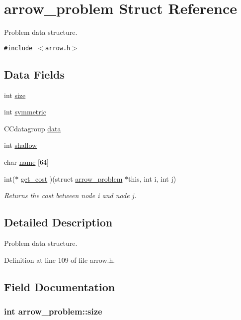 \hypertarget{structarrow__problem}{
\section{arrow\_\-problem Struct Reference}
\label{structarrow__problem}
}
Problem data structure.  


{\tt \#include $<$arrow.h$>$}

\subsection*{Data Fields}
\begin{CompactItemize}
\item 
int \hyperlink{structarrow__problem_de8573ddc391d06b08b65923fca693ec}{size}
\item 
int \hyperlink{structarrow__problem_168ab92e9d7a873740a2550f4d3510d9}{symmetric}
\item 
CCdatagroup \hyperlink{structarrow__problem_5f04fe51bf6438b8f844c8cc06eb5ba0}{data}
\item 
int \hyperlink{structarrow__problem_8c3f4f7794c1430440658d69151b296d}{shallow}
\item 
char \hyperlink{structarrow__problem_49462b24d5f3de4c973bfcf868d7b606}{name} \mbox{[}64\mbox{]}
\item 
int($\ast$ \hyperlink{structarrow__problem_4f1f4c9ef90f240b248e8f39360da769}{get\_\-cost} )(struct \hyperlink{structarrow__problem}{arrow\_\-problem} $\ast$this, int i, int j)
\begin{CompactList}\small\item\em Returns the cost between node i and node j. \item\end{CompactList}\end{CompactItemize}


\subsection{Detailed Description}
Problem data structure. 

Definition at line 109 of file arrow.h.

\subsection{Field Documentation}
\hypertarget{structarrow__problem_de8573ddc391d06b08b65923fca693ec}{
\subsubsection{\setlength{\rightskip}{0pt plus 5cm}int {\bf arrow\_\-problem::size}}}
\label{structarrow__problem_de8573ddc391d06b08b65923fca693ec}


